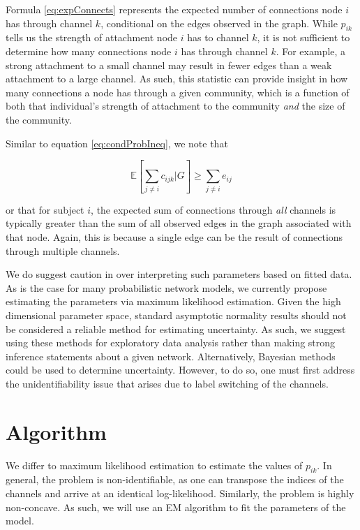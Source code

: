 \documentclass[11pt]{amsart}
\newcommand{\latcon}[3]{c_{#1#2#3} }
\begin{document}
Formula \ref{eq:expConnects} represents the expected number of connections node $i$ has through channel $k$, 
conditional on the edges observed in the graph. 
While $p_{ik}$ tells us the strength of attachment node $i$ has to 
channel $k$, it is not sufficient to determine how many connections
node $i$ has through channel $k$. For example, a strong attachment to a small channel
may result in fewer edges than a weak attachment to a large channel.
As such, this statistic can provide insight in how many connections a node has through a given 
community, which is a function of both that individual's strength of attachment to the community 
\emph{and} the size of the community. 

Similar to equation \ref{eq:condProbIneq}, we note that 

\begin{equation} \label{eq:expIneq}
\mathbb{E}\left[ \scriptstyle \sum_{j \neq i} \latcon{i}{j}{k} | G \right]  \geq \sum_{j \neq i} e_{ij}
\end{equation}

or that for subject $i$, the expected sum of connections through \emph{all} 
channels is typically greater than the sum of all observed edges in the graph associated with that node. 
Again, this is because a single edge can be the result of connections through multiple channels. 

We do suggest caution in over interpreting such parameters based on fitted data. 
As is the case for many probabilistic network models, 
we currently propose estimating the parameters via maximum likelihood estimation.
Given the high dimensional parameter space, 
standard asymptotic normality results 
should not be considered a reliable method for estimating uncertainty.
As such, we suggest using these methods for exploratory data analysis
rather than making strong inference statements about a given network. 
Alternatively, Bayesian methods could be used to determine uncertainty. 
However, to do so, one must first address the unidentifiability issue
that arises due to label switching of the channels. 

\section{Algorithm}
\label{sec:algorithm}

We differ to maximum likelihood estimation to estimate the values of $p_{ik}$. 
In general, the problem is non-identifiable, as  one can transpose the indices 
of the channels and arrive at an identical log-likelihood. Similarly, the problem is highly 
non-concave. As such, we will use an EM algorithm \cite{EM} to fit the parameters of the model. 
\end{document}
